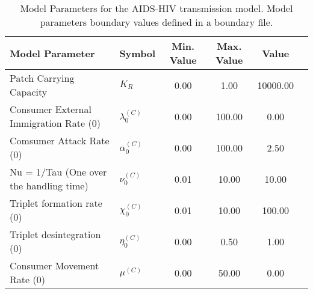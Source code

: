 \begin{table}
\centering
\begin{tabular}{p{5cm}lcccc}
{\bf Model Parameter} & {\bf Symbol} & {\bf Min. Value} & {\bf Max. Value} & {\bf Value}\\
\hline\hline
Patch Carrying Capacity & $K_R$ & 0.00 & 1.00 & 10000.00\\
Consumer External Immigration Rate (0) & $\lambda^{(C)}_0$ & 0.00 & 100.00 & 0.00\\
Comsumer Attack Rate (0) & $\alpha^{(C)}_0$ & 0.00 & 100.00 & 2.50\\
Nu = 1/Tau (One over the handling time) & $\nu^{(C)}_0$ & 0.01 & 10.00 & 10.00\\
Triplet formation rate (0) & $\chi^{(C)}_0$ & 0.01 & 10.00 & 100.00\\
Triplet desintegration (0) & $\eta^{(C)}_0$ & 0.00 & 0.50 & 1.00\\
Consumer Movement Rate (0) & $\mu^{(C)}$ & 0.00 & 50.00 & 0.00\\
\hline\hline
\end{tabular}
\caption{Model Parameters for the AIDS-HIV transmission model. Model parameters boundary values defined in a boundary file.}
\end{table}

